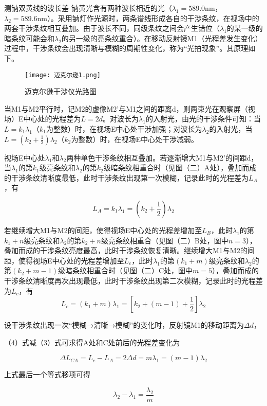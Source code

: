 \documentclass[dvipsnames, svgnames,a4paper,11pt]{article}
\begin{document}
\begin{question}
	测钠双黄线的波长差
	\tcblower
	钠黄光含有两种波长相近的光（\(\lambda_1 = 589.0 \text{nm}\)，\(\lambda_2 = 589.6 \text{nm}\)）。采用钠灯作光源时，两条谱线形成各自的干涉条纹，在视场中的两套干涉条纹相互叠加。由于波长不同，同级条纹之间会产生错位（\(\lambda_1\)的某一级的暗条纹可能会和\(\lambda_2\)的另一级的亮条纹重合）。在移动反射镜M1（光程差发生变化）过程中，干涉条纹会出现清晰与模糊的周期性变化，称为“光拍现象”。其原理如下。
	\begin{figure}[H]
		\centering
		\texttt{[image: 迈克尔逊1.png]}
		\caption{迈克尔逊干涉仪光路图}
	\end{figure}
	当M1与M2平行时，记M2的虚像M2'与M1之间的距离d，则两束光在观察屏（视场）E中心处的光程差为$L = 2d$。对波长为\(\lambda_1\)的入射光，由光的干涉条件可知：当\(L = k_1\lambda_1\)（\(k_1\)为整数）时，在视场E中心处干涉加强；对波长为\(\lambda_2\)的入射光，当\(L = \left(k_2 + \frac{1}{2}\right)\lambda_2\)（\(k_2\)为整数）时，在视场E中心处干涉减弱。

视场E中心处\(\lambda_1\)和\(\lambda_2\)两种单色干涉条纹相互叠加。若逐渐增大M1与M2'的间距d，当\(\lambda_1\)的第\(k_1\)级亮条纹和\(\lambda_2\)的第\(k_2\)级暗条纹相重合时（见图（二）A处），叠加而成的干涉条纹清晰度最低，此时干涉条纹出现第一次模糊，记录此时的光程差为\(L_A\)，有

\[
L_A = k_1\lambda_1 = \left( k_2 + \frac{1}{2} \right) \lambda_2\tag{3}
\]

若继续增大M1与M2的间距，使得视场E中心处的光程差增加至\(L_B\)，此时\(\lambda_1\)的第\(k_1 + n\)级亮条纹和\(\lambda_2\)的第\(k_2 + n\)级亮条纹相重合（见图（二）B处，图中\(n = 3\)），叠加而成的干涉条纹亮度最高，此时干涉条纹恢复清晰。继续增大M1与M2的间距，使得视场E中心处的光程差增加至\( L_c \)，此时\(\lambda_1\)的第\(( k_1 + m )\)级亮条纹和\(\lambda_2\)的第\(( k_2 + m - 1 )\)级暗条纹相重合时（见图（二）C处，图中\( m = 5 \)），叠加而成的干涉条纹清晰度再次出现最低，此时干涉条纹出现第二次模糊，记录此时的光程差为\( L_c \)，有
\[ 
L_c = \left( k_1 + m \right) \lambda_1 = \left[ k_2 + (m - 1) + \frac{1}{2} \right] \lambda_2 \tag{4} 
\]

设干涉条纹出现一次“模糊→清晰→模糊”的变化时，反射镜M1的移动距离为\(\Delta d\)，

（4）式减（3）式可求得A处和C处前后的光程差变化为

\[ 
\Delta L_{CA} = L_c - L_A = 2\Delta d = m\lambda_1 = (m - 1)\lambda_2 \tag{5} 
\]

上式最后一个等式移项可得

\[ 
\lambda_2 - \lambda_1 = \frac{\lambda_2}{m} \tag{6} 
\]


\end{question}
\end{document}
